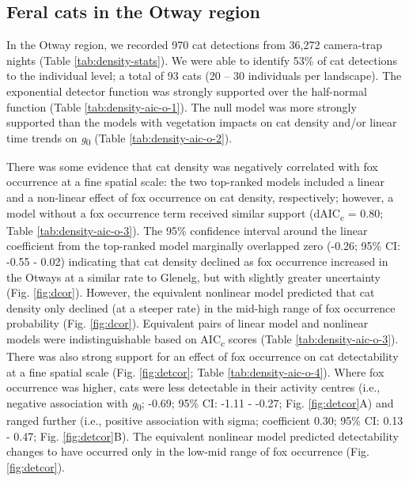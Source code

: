 \documentclass[]{elsarticle} %
\begin{document}
\hypertarget{feral-cats-in-the-otway-region}{%
\subsection{Feral cats in the Otway region}\label{feral-cats-in-the-otway-region}}

In the Otway region, we recorded 970 cat detections from 36,272 camera-trap nights (Table \ref{tab:density-stats}). We were able to identify 53\% of cat detections to the individual level; a total of 93 cats (20 -- 30 individuals per landscape). The exponential detector function was strongly supported over the half-normal function (Table \ref{tab:density-aic-o-1}). The null model was more strongly supported than the models with vegetation impacts on cat density and/or linear time trends on \emph{g}\textsubscript{0} (Table \ref{tab:density-aic-o-2}).

There was some evidence that cat density was negatively correlated with fox occurrence at a fine spatial scale: the two top-ranked models included a linear and a non-linear effect of fox occurrence on cat density, respectively; however, a model without a fox occurrence term received similar support (dAIC\textsubscript{c} = 0.80; Table \ref{tab:density-aic-o-3}). The 95\% confidence interval around the linear coefficient from the top-ranked model marginally overlapped zero (-0.26; 95\% CI: -0.55 - 0.02) indicating that cat density declined as fox occurrence increased in the Otways at a similar rate to Glenelg, but with slightly greater uncertainty (Fig. \ref{fig:dcor}). However, the equivalent nonlinear model predicted that cat density only declined (at a steeper rate) in the mid-high range of fox occurrence probability (Fig. \ref{fig:dcor}). Equivalent pairs of linear model and nonlinear models were indistinguishable based on AIC\textsubscript{c} scores (Table \ref{tab:density-aic-o-3}).
There was also strong support for an effect of fox occurrence on cat detectability at a fine spatial scale (Fig. \ref{fig:detcor}; Table \ref{tab:density-aic-o-4}). Where fox occurrence was higher, cats were less detectable in their activity centres (i.e., negative association with \emph{g}\textsubscript{0}; -0.69; 95\% CI: -1.11 - -0.27; Fig. \ref{fig:detcor}A) and ranged further (i.e., positive association with sigma; coefficient 0.30; 95\% CI: 0.13 - 0.47; Fig. \ref{fig:detcor}B). The equivalent nonlinear model predicted detectability changes to have occurred only in the low-mid range of fox occurrence (Fig. \ref{fig:detcor}).
\end{document}
